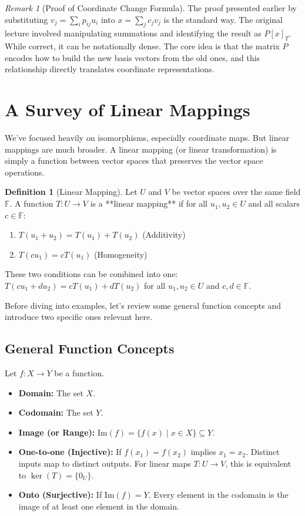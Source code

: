 \documentclass[11pt]{article}
\theoremstyle{definition}
\newtheorem{definition}[theorem]{Definition}
\theoremstyle{remark}
\newtheorem{remark}[theorem]{Remark}
\newcommand{\F}{\mathbb{F}}
\newcommand{\coord}[2]{[#1]_{#2}} %
\newcommand{\img}{\mathrm{Im}} %
\begin{document}
\begin{remark}[Proof of Coordinate Change Formula]
    The proof presented earlier by substituting $v_j = \sum_i p_{ij} u_i$ into $x = \sum_j c_j v_j$ is the standard way. The original lecture involved manipulating summations and identifying the result as $P \coord{x}{T}$. While correct, it can be notationally dense. The core idea is that the matrix $P$ encodes how to build the new basis vectors from the old ones, and this relationship directly translates coordinate representations.
\end{remark}

\section{A Survey of Linear Mappings}

We've focused heavily on isomorphisms, especially coordinate maps. But linear mappings are much broader. A linear mapping (or linear transformation) is simply a function between vector spaces that preserves the vector space operations.

\begin{definition}[Linear Mapping]
    Let $U$ and $V$ be vector spaces over the same field $\F$. A function $T: U \to V$ is a **linear mapping** if for all $u_1, u_2 \in U$ and all scalars $c \in \F$:
    \begin{enumerate}
        \item $T(u_1 + u_2) = T(u_1) + T(u_2)$ (Additivity)
        \item $T(c u_1) = c T(u_1)$ (Homogeneity)
    \end{enumerate}
    These two conditions can be combined into one: $T(c u_1 + d u_2) = c T(u_1) + d T(u_2)$ for all $u_1, u_2 \in U$ and $c, d \in \F$.
\end{definition}

Before diving into examples, let's review some general function concepts and introduce two specific ones relevant here.

\subsection{General Function Concepts}
Let $f: X \to Y$ be a function.
\begin{itemize}
    \item \textbf{Domain:} The set $X$.
    \item \textbf{Codomain:} The set $Y$.
    \item \textbf{Image (or Range):} $\img(f) = \{f(x) \mid x \in X\} \subseteq Y$.
    \item \textbf{One-to-one (Injective):} If $f(x_1) = f(x_2)$ implies $x_1 = x_2$. Distinct inputs map to distinct outputs. For linear maps $T: U \to V$, this is equivalent to $\ker(T) = \{0_U\}$.
    \item \textbf{Onto (Surjective):} If $\img(f) = Y$. Every element in the codomain is the image of at least one element in the domain.
\end{itemize}
\end{document}
